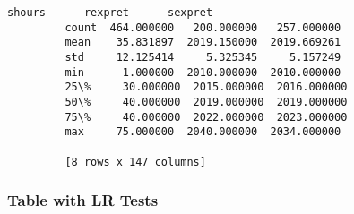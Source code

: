 \documentclass[11pt]{article}
\begin{document}
\begin{Verbatim}[commandchars=\\\{\}]
                    shours      rexpret      sexpret  
         count  464.000000   200.000000   257.000000  
         mean    35.831897  2019.150000  2019.669261  
         std     12.125414     5.325345     5.157249  
         min      1.000000  2010.000000  2010.000000  
         25\%     30.000000  2015.000000  2016.000000  
         50\%     40.000000  2019.000000  2019.000000  
         75\%     40.000000  2022.000000  2023.000000  
         max     75.000000  2040.000000  2034.000000  
         
         [8 rows x 147 columns]
\end{Verbatim}
            
    \subsubsection{Table with LR Tests}\label{table-with-lr-tests}
\end{document}
